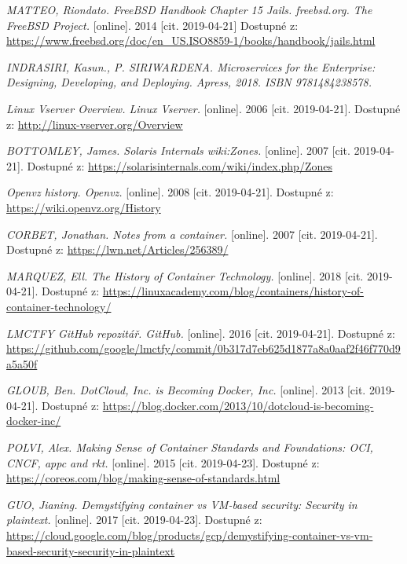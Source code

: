 \begin{thebibliography}{10}


  \emph{MATTEO, Riondato. FreeBSD Handbook Chapter 15 Jails. freebsd.org. The FreeBSD Project.} [online]. 2014 [cit. 2019-04-21] Dostupné z: \url{https://www.freebsd.org/doc/en_US.ISO8859-1/books/handbook/jails.html}	
    
    \emph{INDRASIRI, Kasun., P. SIRIWARDENA. Microservices for the Enterprise: Designing, Developing, and Deploying. Apress, 2018. ISBN 9781484238578.}

    \emph{Linux Vserver Overview. Linux Vserver.} [online]. 2006 [cit. 2019-04-21]. Dostupné z: \url{http://linux-vserver.org/Overview}
    
	\emph{BOTTOMLEY, James. Solaris Internals wiki:Zones.} [online]. 2007 [cit. 2019-04-21]. Dostupné z: \url{https://solarisinternals.com/wiki/index.php/Zones}	  
	
    \emph{Openvz history. Openvz.} [online]. 2008 [cit. 2019-04-21]. Dostupné z: \url{https://wiki.openvz.org/History}
    
    \emph{CORBET, Jonathan. Notes from a container.} [online]. 2007 [cit. 2019-04-21]. Dostupné z: \url{https://lwn.net/Articles/256389/}    

    \emph{MARQUEZ, Ell. The History of Container Technology.} [online]. 2018 [cit. 2019-04-21]. Dostupné z: \url{https://linuxacademy.com/blog/containers/history-of-container-technology/}    

    \emph{LMCTFY GitHub repozitář. GitHub.} [online]. 2016 [cit. 2019-04-21]. Dostupné z: \url{https://github.com/google/lmctfy/commit/0b317d7eb625d1877a8a0aaf2f46f770d9a5a50f}    

	\emph{GLOUB, Ben. DotCloud, Inc. is Becoming Docker, Inc.} [online]. 2013 [cit. 2019-04-21]. Dostupné z: \url{https://blog.docker.com/2013/10/dotcloud-is-becoming-docker-inc/}
    
    \emph{POLVI, Alex. Making Sense of Container Standards and Foundations: OCI, CNCF, appc and rkt.} [online]. 2015 [cit. 2019-04-23]. Dostupné z: \url{https://coreos.com/blog/making-sense-of-standards.html} 

    \emph{GUO, Jianing. Demystifying container vs VM-based security: Security in plaintext.} [online]. 2017 [cit. 2019-04-23]. Dostupné z: \url{https://cloud.google.com/blog/products/gcp/demystifying-container-vs-vm-based-security-security-in-plaintext}


\end{thebibliography}
